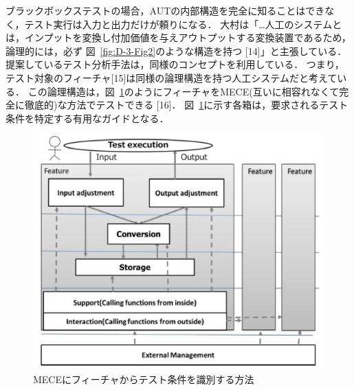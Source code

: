 \documentclass[a4paper,11pt]{jreport}
\begin{document}
ブラックボックステストの場合，AUTの内部構造を完全に知ることはできなく，テスト実行は入力と出力だけが頼りになる．
大村は「…人工のシステムとは，インプットを変換し付加価値を与えアウトプットする変換装置であるため，論理的には，必ず 図~\ref{fig:D-3-Fig2}のような構造を持つ [14]」と主張している．
提案しているテスト分析手法は，同様のコンセプトを利用している． つまり，テスト対象のフィーチャ[15]は同様の論理構造を持つ人工システムだと考えている．
この論理構造は，図~\ref{fig:D-3-Fig3}のようにフィーチャをMECE(互いに相容れなくて完全に徹底的)な方法でテストできる [16]． 図~\ref{fig:D-3-Fig3}に示す各箱は，要求されるテスト条件を特定する有用なガイドとなる．
\begin{figure}[h]
  \begin{center}
  \includegraphics[width=12cm]{./image/D-3-Fig3.png}
  \caption{MECEにフィーチャからテスト条件を識別する方法}
  \label{fig:D-3-Fig3}
  \end{center}
   \end{figure}
\end{document}
